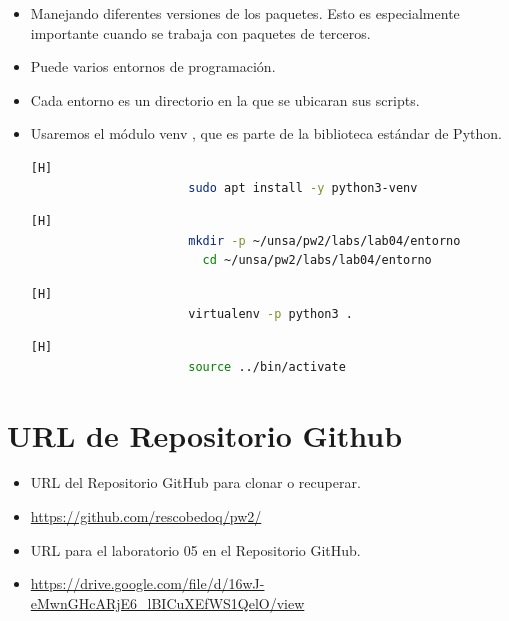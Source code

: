 \documentclass{article}
\begin{document}
\begin{itemize}
\begin{itemize}
\begin{itemize}
                \item Manejando diferentes versiones de los paquetes. Esto es especialmente importante cuando se trabaja con paquetes de terceros.
                \item Puede varios entornos de programación.
                \item Cada entorno es un directorio en la que se ubicaran sus scripts.
                \item Usaremos el módulo venv , que es parte de la biblioteca estándar de Python.
                \begin{lstlisting}[language=bash,caption={Entorno de Linux-Instalemos venv escribiendo:}][H]
    		          sudo apt install -y python3-venv
    	        \end{lstlisting}
                \begin{lstlisting}[language=bash,caption={Entorno de Linux-Para crear un ambiente elija en qué directorio.}][H]
    		          mkdir -p ~/unsa/pw2/labs/lab04/entorno
                        cd ~/unsa/pw2/labs/lab04/entorno
    	        \end{lstlisting}
                \begin{lstlisting}[language=bash,caption={Entorno de Linux-En el directorio crea un entorno virtual ejecutando el siguiente comando:}][H]
    		          virtualenv -p python3 .
    	        \end{lstlisting}
                \begin{lstlisting}[language=bash,caption={Entorno de Linux-Ejecute el script de activación para activar el entorno virtual:}][H]
    		          source ../bin/activate
    	        \end{lstlisting}
            \end{itemize}
        \end{itemize}
	\end{itemize}
	
	\section{URL de Repositorio Github}
	\begin{itemize}
		\item URL del Repositorio GitHub para clonar o recuperar.
		\item \url{https://github.com/rescobedoq/pw2/}
		\item URL para el laboratorio 05 en el Repositorio GitHub.
		\item \url{https://drive.google.com/file/d/16wJ-eMwnGHcARjE6_lBICuXEfWS1QelO/view}
	\end{itemize}
	
\end{document}
